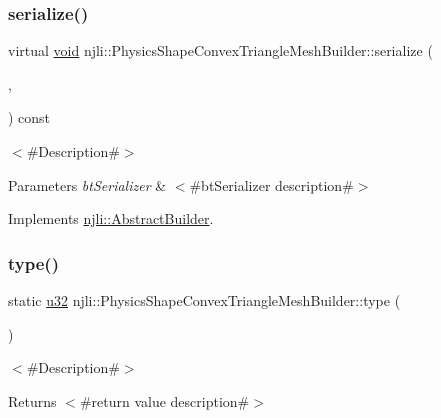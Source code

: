 \subsubsection{\texorpdfstring{serialize()}{serialize()}}
{\footnotesize\ttfamily virtual \mbox{\hyperlink{_thread_8h_af1e856da2e658414cb2456cb6f7ebc66}{void}} njli\+::\+Physics\+Shape\+Convex\+Triangle\+Mesh\+Builder\+::serialize (\begin{DoxyParamCaption}\item[{\mbox{\hyperlink{_thread_8h_af1e856da2e658414cb2456cb6f7ebc66}{void}} $\ast$}]{,  }\item[{bt\+Serializer $\ast$}]{ }\end{DoxyParamCaption}) const\hspace{0.3cm}{\ttfamily [virtual]}}

$<$\#\+Description\#$>$


\begin{DoxyParams}{Parameters}
{\em bt\+Serializer} & $<$\#bt\+Serializer description\#$>$ \\
\hline
\end{DoxyParams}


Implements \mbox{\hyperlink{classnjli_1_1_abstract_builder_ab66b774e02ccb9da554c9aab7fa6d981}{njli\+::\+Abstract\+Builder}}.

\mbox{\label{classnjli_1_1_physics_shape_convex_triangle_mesh_builder_a0dade1bcadeba5142bed3d507bd6dbbb}} 
\subsubsection{\texorpdfstring{type()}{type()}}
{\footnotesize\ttfamily static \mbox{\hyperlink{_util_8h_a10e94b422ef0c20dcdec20d31a1f5049}{u32}} njli\+::\+Physics\+Shape\+Convex\+Triangle\+Mesh\+Builder\+::type (\begin{DoxyParamCaption}{ }\end{DoxyParamCaption})\hspace{0.3cm}{\ttfamily [static]}}

$<$\#\+Description\#$>$

\begin{DoxyReturn}{Returns}
$<$\#return value description\#$>$ 
\end{DoxyReturn}


